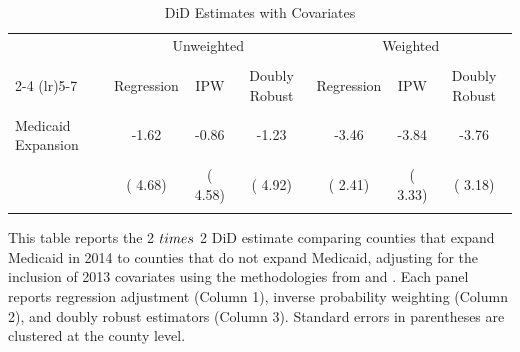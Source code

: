 \begin{table}[htbp]\centering
\caption{DiD Estimates with Covariates}
\label{tab:2x2_csdid_sc}
\begin{threeparttable}
\begin{tabular}{l*{6}{c}}
\toprule
 & \multicolumn{3}{c}{Unweighted} & \multicolumn{3}{c}{Weighted} \\\\
\cmidrule(lr){2-4} \cmidrule(lr){5-7}
 & Regression & IPW & Doubly Robust & Regression & IPW & Doubly Robust \\\\
\midrule
Medicaid Expansion &  -1.62 &  -0.86 &  -1.23 &  -3.46 &  -3.84 &  -3.76 \\\\
 & (  4.68) & (  4.58) & (  4.92) & (  2.41) & (  3.33) & (  3.18) \\\\
\bottomrule
\end{tabular}
\begin{tablenotes}[para]
\footnotesize \singlespacing
\item This table reports the 2 $\\times$ 2 DiD estimate comparing counties that expand Medicaid in 2014 to counties that do not expand Medicaid, adjusting for the inclusion of 2013 covariates using the methodologies from \citet{SantAnna2020} and \citet{Callaway2021}. Each panel reports regression adjustment (Column 1), inverse probability weighting (Column 2), and doubly robust estimators (Column 3). Standard errors in parentheses are clustered at the county level.
\end{tablenotes}
\end{threeparttable}
\end{table}
